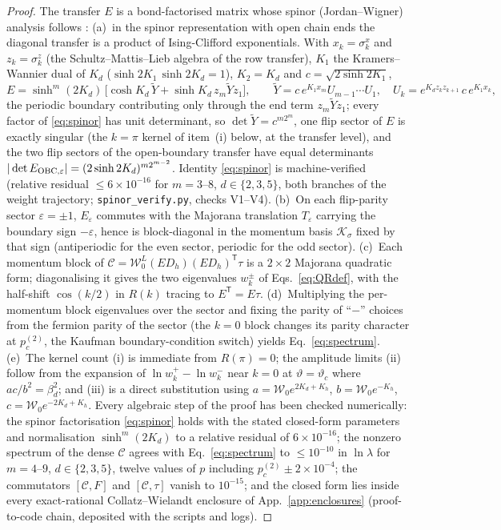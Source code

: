 \documentclass[11pt]{article}
\newcommand{\pctwo}{p_c^{(2)}}
\newcommand{\vth}{\vartheta}
\newcommand{\Ccomp}{\mathcal{C}}
\newcommand{\Wz}{\mathcal{W}_0}
\begin{document}
\begin{proof}
The transfer $E$ is a bond-factorised matrix whose spinor (Jordan--Wigner)
analysis follows \citet{Kaufman1949,Newell1950,Stephenson1964,Schultz1964}:
(a)~in the spinor representation with open chain ends the diagonal transfer
is a product of Ising-Clifford exponentials.  With
$x_k=\sigma^x_k$ and $z_k=\sigma^z_k$ (the Schultz--Mattis--Lieb algebra of
the row transfer), $K_1$ the Kramers--Wannier dual of $K_d$
($\sinh2K_1\,\sinh2K_d=1$), $K_2=K_d$ and $c=\sqrt{2\sinh2K_1}$,
\begin{equation}
  E=\sinh^m(2K_d)\,\bigl[\cosh K_d\,\tilde Y+\sinh K_d\,z_m\tilde Y z_1\bigr],\qquad
  \tilde Y=c\,e^{K_1x_m}U_{m-1}\cdots U_1,\quad
  U_k=e^{K_dz_kz_{k+1}}\,c\,e^{K_1x_k},
  \label{eq:spinor}
\end{equation}
the periodic boundary contributing only through the end term $z_m\tilde Y
z_1$; every factor of \eqref{eq:spinor} has unit determinant, so
$\det\tilde Y=c^{m2^m}$, one flip sector of $E$ is exactly singular (the
$k=\pi$ kernel of item~(i) below, at the transfer level), and the two flip
sectors of the open-boundary transfer have equal determinants
$|\det E_{\rm OBC,\varepsilon}|=(2\sinh2K_d)^{m2^{m-2}}$.  Identity
\eqref{eq:spinor} is machine-verified (relative residual $\le6\times
10^{-16}$ for $m=3$--$8$, $d\in\{2,3,5\}$, both branches of the weight
trajectory; \texttt{spinor\_verify.py}, checks V1--V4).
(b)~On each flip-parity sector $\varepsilon=\pm1$, $E_\varepsilon$ commutes
with the Majorana translation $T_\varepsilon$ carrying the boundary sign
$-\varepsilon$, hence is block-diagonal in the momentum basis
$\mathcal K_\sigma$ fixed by that sign (antiperiodic for the even sector,
periodic for the odd sector).  (c)~Each momentum block of
$\Ccomp=\Wz^L(ED_h)(ED_h)^{\mathsf T}\tau$ is a $2\times2$ Majorana
quadratic form; diagonalising it gives the two eigenvalues $w_k^\pm$ of
Eqs.~\eqref{eq:QRdef}, with the half-shift $\cos(k/2)$ in $R(k)$ tracing to
$E^{\mathsf T}=E\tau$.  (d)~Multiplying the per-momentum block eigenvalues
over the sector and fixing the parity of ``$-$'' choices from the fermion
parity of the sector (the $k=0$ block changes its parity character at
$\pctwo$, the Kaufman boundary-condition switch) yields
Eq.~\eqref{eq:spectrum}.  (e)~The kernel count (i) is immediate from
$R(\pi)=0$; the amplitude limits (ii) follow from the expansion of
$\ln w_k^+-\ln w_k^-$ near $k=0$ at $\vth=\vth_c$ where
$ac/b^2=\beta_d^2$; and (iii) is a direct substitution using
$a=\Wz e^{2K_d+K_h}$, $b=\Wz e^{-K_h}$, $c=\Wz e^{-2K_d+K_h}$.
Every algebraic step of the proof has been checked numerically: the spinor
factorisation \eqref{eq:spinor} holds with the stated closed-form
parameters and normalisation $\sinh^m(2K_d)$ to a relative residual of
$6\times10^{-16}$; the nonzero
spectrum of the dense $\Ccomp$ agrees with Eq.~\eqref{eq:spectrum} to
$\le10^{-10}$ in $\ln\lambda$ for $m=4$--$9$, $d\in\{2,3,5\}$, twelve
values of $p$ including $\pctwo\pm2\times10^{-4}$; the commutators
$[\Ccomp,F]$ and $[\Ccomp,\tau]$ vanish to $10^{-15}$; and the closed form
lies inside every exact-rational Collatz--Wielandt enclosure of
App.~\ref{app:enclosures} (proof-to-code chain, deposited with the
scripts and logs).
\end{proof}
\end{document}
